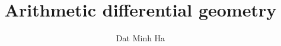 

\setcounter{section}{-1}





	\title{Arithmetic differential geometry}
	
	\author{Dat Minh Ha}
	\maketitle
	
	\begin{abstract}
	    
	\end{abstract}
	
	{
      \hypersetup{} 
      \tableofcontents %
    }
    
    
    
    
    
    
    
    
	
	\printbibliography

